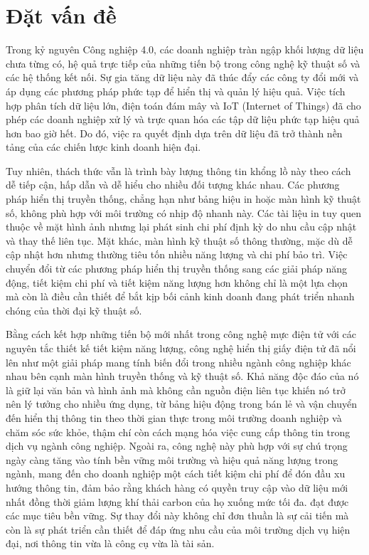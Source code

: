 \documentclass[../DoAn.tex]{subfiles}
\begin{document}
\section{Đặt vấn đề}
\label{section:1.1}
Trong kỷ nguyên Công nghiệp 4.0, các doanh nghiệp tràn ngập khối lượng dữ liệu chưa từng có, hệ quả trực tiếp của những tiến bộ trong công nghệ kỹ thuật số và các hệ thống kết nối. Sự gia tăng dữ liệu này đã thúc đẩy các công ty đổi mới và áp dụng các phương pháp phức tạp để hiển thị và quản lý hiệu quả. Việc tích hợp phân tích dữ liệu lớn, điện toán đám mây và IoT (Internet of Things) đã cho phép các doanh nghiệp xử lý và trực quan hóa các tập dữ liệu phức tạp hiệu quả hơn bao giờ hết. Do đó, việc ra quyết định dựa trên dữ liệu đã trở thành nền tảng của các chiến lược kinh doanh hiện đại.

Tuy nhiên, thách thức vẫn là trình bày lượng thông tin khổng lồ này theo cách dễ tiếp cận, hấp dẫn và dễ hiểu cho nhiều đối tượng khác nhau. Các phương pháp hiển thị truyền thống, chẳng hạn như bảng hiệu in hoặc màn hình kỹ thuật số, không phù hợp với môi trường có nhịp độ nhanh này. Các tài liệu in tuy quen thuộc về mặt hình ảnh nhưng lại phát sinh chi phí định kỳ do nhu cầu cập nhật và thay thế liên tục. Mặt khác, màn hình kỹ thuật số thông thường, mặc dù dễ cập nhật hơn nhưng thường tiêu tốn nhiều năng lượng và chi phí bảo trì. Việc chuyển đổi từ các phương pháp hiển thị truyền thống sang các giải pháp năng động, tiết kiệm chi phí và tiết kiệm năng lượng hơn không chỉ là một lựa chọn mà còn là điều cần thiết để bắt kịp bối cảnh kinh doanh đang phát triển nhanh chóng của thời đại kỹ thuật số.

Bằng cách kết hợp những tiến bộ mới nhất trong công nghệ mực điện tử với các nguyên tắc thiết kế tiết kiệm năng lượng, công nghệ hiển thị giấy điện tử đã nổi lên như một giải pháp mang tính biến đổi trong nhiều ngành công nghiệp khác nhau bên cạnh màn hình truyền thống và kỹ thuật số. Khả năng độc đáo của nó là giữ lại văn bản và hình ảnh mà không cần nguồn điện liên tục khiến nó trở nên lý tưởng cho nhiều ứng dụng, từ bảng hiệu động trong bán lẻ và vận chuyển đến hiển thị thông tin theo thời gian thực trong môi trường doanh nghiệp và chăm sóc sức khỏe, thậm chí còn cách mạng hóa việc cung cấp thông tin trong dịch vụ ngành công nghiệp. Ngoài ra, công nghệ này phù hợp với sự chú trọng ngày càng tăng vào tính bền vững môi trường và hiệu quả năng lượng trong ngành, mang đến cho doanh nghiệp một cách tiết kiệm chi phí để đón đầu xu hướng thông tin, đảm bảo rằng khách hàng có quyền truy cập vào dữ liệu mới nhất đồng thời giảm lượng khí thải carbon của họ xuống mức tối đa. đạt được các mục tiêu bền vững. Sự thay đổi này không chỉ đơn thuần là sự cải tiến mà còn là sự phát triển cần thiết để đáp ứng nhu cầu của môi trường dịch vụ hiện đại, nơi thông tin vừa là công cụ vừa là tài sản.
\end{document}
